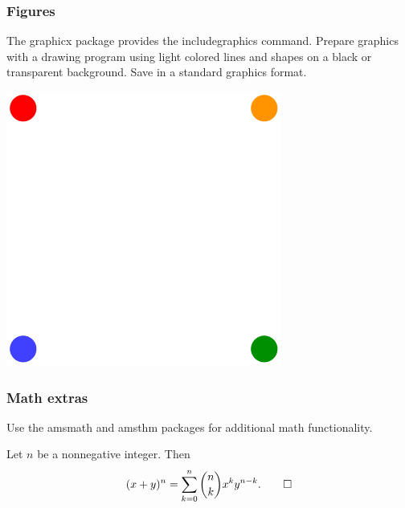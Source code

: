 \documentclass[t,14pt]{beamer}
\begin{document}
\begin{frame}
  \frametitle{Figures}
  \large 
  The \alert{graphicx} package provides the \alert{includegraphics}
  command. Prepare graphics with a drawing program using light colored
  lines and shapes on a black or transparent background. Save in a
  standard graphics format.
  \begin{center}
    \includegraphics[scale=0.5]{figure}
  \end{center}
\end{frame}

\begin{frame}
  \frametitle{Math extras}
  \large
  Use the \alert{amsmath} and \alert{amsthm} packages for additional
  math functionality.

  \begin{theorem}[Binomial]
    Let $n$ be a nonnegative integer. Then
    \[
    (x+y)^n = \sum_{k=0}^n \binom{n}{k} x^k y^{n-k}. \qed
    \]
  \end{theorem}
\end{frame}
\end{document}
